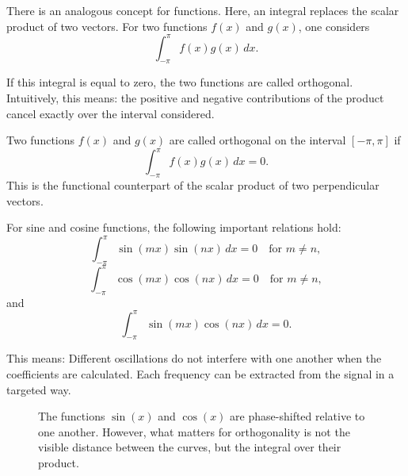 There is an analogous concept for functions.
Here, an integral replaces the scalar product of two vectors.
For two functions \(f(x)\) and \(g(x)\), one considers
\[
\int_{-\pi}^{\pi} f(x)g(x)\,dx.
\]

If this integral is equal to zero, the two functions are called orthogonal.
Intuitively, this means:
the positive and negative contributions of the product cancel exactly over the interval considered.

\begin{MathBox}
	\small
	\label{box:anhangA-fourier-orthogonalitaet}
	Two functions \(f(x)\) and \(g(x)\) are called orthogonal on the interval
	\([-\pi,\pi]\) if
	\[
	\int_{-\pi}^{\pi} f(x)g(x)\,dx=0.
	\]
	This is the functional counterpart of the scalar product of two perpendicular vectors.
\end{MathBox}

For sine and cosine functions, the following important relations hold:
\[
\int_{-\pi}^{\pi} \sin(mx)\sin(nx)\,dx=0
\quad \text{for } m\neq n,
\]
\[
\int_{-\pi}^{\pi} \cos(mx)\cos(nx)\,dx=0
\quad \text{for } m\neq n,
\]
and
\[
\int_{-\pi}^{\pi} \sin(mx)\cos(nx)\,dx=0.
\]

This means:
Different oscillations do not interfere with one another when the coefficients are calculated.
Each frequency can be extracted from the signal in a targeted way.
\FloatBarrier
\begin{figure}[H]
	\centering
	\caption{The functions $\sin(x)$ and $\cos(x)$ are phase-shifted relative to one another.
		However, what matters for orthogonality is not the visible distance between the curves,
		but the integral over their product.}
	\label{fig:sin_cos_orthogonalitaet}
\end{figure}

